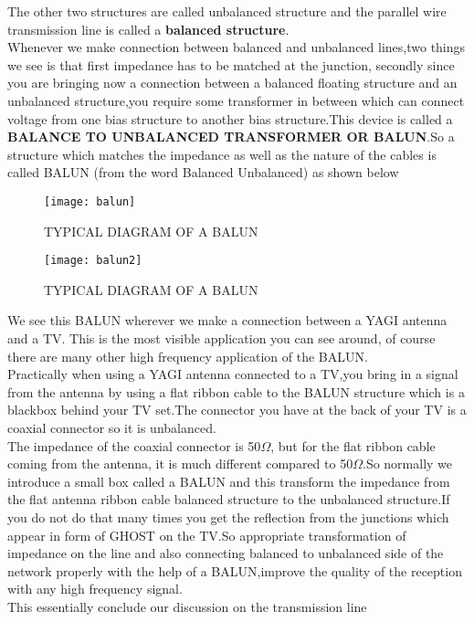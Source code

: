 The other two structures are called unbalanced structure and the parallel wire transmission line is called a \textbf{balanced structure}.\\
Whenever we make connection between balanced and unbalanced lines,two things we see is that first impedance has to be matched at the junction, secondly since you are bringing now a connection between a balanced floating structure and an unbalanced structure,you require some transformer in between which can connect voltage from one bias structure to another bias structure.This device is called a \textbf{BALANCE TO UNBALANCED TRANSFORMER OR BALUN}.So a structure which matches the impedance as well as the nature of the cables is called BALUN (from the word Balanced Unbalanced) as shown below\\
\begin{figure}[h]
	\centering
	\texttt{[image: balun]}
	\caption{TYPICAL DIAGRAM OF A BALUN}
\end{figure}

\begin{figure}[h]
	\centering
	\texttt{[image: balun2]}
	\caption{TYPICAL DIAGRAM OF A BALUN}
\end{figure}
   We see this BALUN wherever we make a connection between a YAGI antenna and a TV. This is the most visible application you can see around, of course there are many other high frequency application of the BALUN.\\
 Practically when using a YAGI antenna connected to a TV,you bring in a signal from the antenna by using a flat ribbon cable to the BALUN structure which is a blackbox behind your TV set.The connector you have at the back of your TV is a coaxial connector so it is unbalanced.\\
 The impedance of the coaxial connector is 50$\Omega$, but for the flat ribbon cable coming from the antenna, it is much different compared to 50$\Omega$.So normally we introduce a small box called a BALUN and this transform the impedance from the flat  antenna ribbon cable balanced structure to the unbalanced structure.If you do not do that many times you get  the reflection from the junctions which appear in form of GHOST on the TV.So appropriate transformation of impedance on the line and also connecting balanced to unbalanced side of the network properly with the help of a BALUN,improve the quality of the reception with any high frequency signal.\\
This essentially conclude our discussion on the transmission line \\
